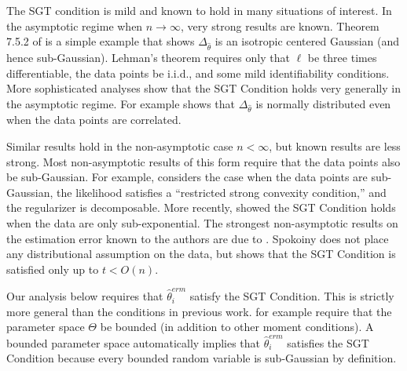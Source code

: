 \documentclass[twoside]{article}
\newcommand{\w}{\theta}
\newcommand{\wmle}{\hat\w^{erm}}
\newcommand{\what}{{\hat\w}}
\newcommand{\loss}{\ell}
\begin{document}

The SGT condition is mild and known to hold in many situations of interest.
In the asymptotic regime when $n\to\infty$,
very strong results are known.
Theorem 7.5.2 of \citet{lehmann1999elements} is a simple example that shows $\Delta_\what$ is an isotropic centered Gaussian
(and hence sub-Gaussian).
Lehman's theorem requires only that $\loss$ be three times differentiable,
the data points be i.i.d.,
and some mild identifiability conditions.
More sophisticated analyses show that the SGT Condition holds very generally in the asymptotic regime.
For example \citet{spokoiny2012parametricestimation} shows that $\Delta_\what$ is normally distributed even when the data points are correlated.

Similar results hold in the non-asymptotic case $n<\infty$,
but known results are less strong.
Most non-asymptotic results of this form require that the data points also be sub-Gaussian.
For example, \citet{negahban2009unified} considers the case when the data points are sub-Gaussian, the likelihood satisfies a ``restricted strong convexity condition,'' and the regularizer is decomposable.
More recently, \citet{sivakumar2015beyond} showed the SGT Condition holds when the data are only sub-exponential.
The strongest non-asymptotic results on the estimation error known to the authors are due to \citet{spokoiny2012parametricestimation}.
Spokoiny does not place any distributional assumption on the data,
but shows that the SGT Condition is satisfied only up to $t < O(n)$.

Our analysis below requires that $\wmle_i$ satisfy the SGT Condition.
This is strictly more general than the conditions in previous work.
\citet{zhang2012communication} for example require that the parameter space $\Theta$ be bounded (in addition to other moment conditions).
A bounded parameter space automatically implies that $\wmle_i$ satisfies the SGT Condition because every bounded random variable is sub-Gaussian by definition.


\end{document}
